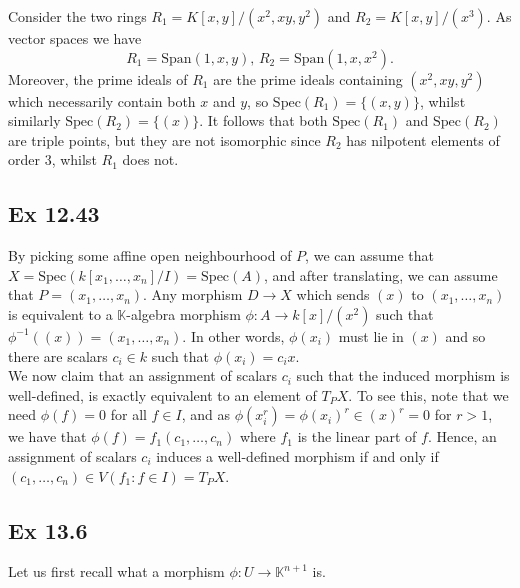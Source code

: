 \documentclass{article}
\theoremstyle{definition}
\newcommand{\K}{\mathbb{K}}
\newcommand{\Spec}{\text{Spec}}
\begin{document}
Consider the two rings $R_1 = K[x, y]/(x^2, xy, y^2)$ and $R_2 = K[x,
y]/(x^3)$. As vector spaces we have 
\[
	R_1 = \text{Span}(1, x, y), \,
	R_2 = \text{Span}(1, x, x^2).
\] 
Moreover, the prime ideals of $R_1$ are the prime ideals containing $(x^2, xy,
y^2)$ which necessarily contain both $x$ and $y$, so $\Spec(R_1) = \{(x, y)\}$,
whilst similarly $\Spec(R_2) = \{(x)\}$. It follows that both $\Spec(R_1)$ and
$\Spec(R_2)$ are triple points, but they are not isomorphic since $R_2$ has
nilpotent elements of order $3$, whilst $R_1$ does not. 

\subsection*{Ex 12.43}

By picking some affine open neighbourhood of $P$, we can assume that $X =
\Spec(k[x_1, \ldots, x_n]/I) = \Spec(A)$, and after translating, we can assume
that $P = (x_1, \ldots, x_n)$. Any morphism $D \to X$ which sends $(x)$ to
$(x_1, \ldots, x_n)$ is equivalent to a $\K$-algebra morphism $\phi : A \to
k[x]/(x^2)$ such that $\phi^{-1}((x)) = (x_1, \ldots, x_n)$. In other words,
$\phi(x_i)$ must lie in $(x)$ and so there are scalars $c_i \in k$ such that
$\phi(x_i) = c_ix$. \\

We now claim that an assignment of scalars $c_i$ such that the induced morphism
is well-defined, is exactly equivalent to an element of $T_P X$. To see this,
note that we need $\phi(f) = 0$ for all $f \in I$, and as $\phi(x_i^r) =
\phi(x_i)^r \in (x)^{r} = 0$ for $r > 1$, we have that $\phi(f) = f_1(c_1,
\ldots, c_n)$ where $f_1$ is the linear part of $f$. Hence, an assignment of
scalars $c_i$ induces a well-defined morphism if and only if $(c_1, \ldots,
c_n) \in V(f_1 : f \in I) = T_P X$.


\subsection*{Ex 13.6}

Let us first recall what a morphism $\phi : U \to \K^{n + 1}$ is.
\end{document}
